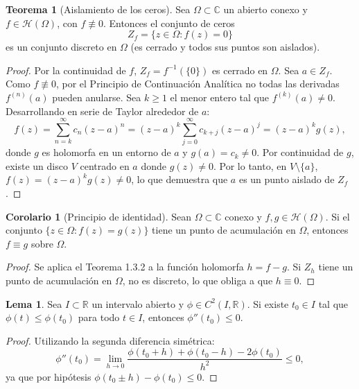 \documentclass[11pt,a4paper]{article}
\theoremstyle{definition}
\newtheorem{teorema}{Teorema}[section]
\newtheorem{lema}{Lema}[section]
\newtheorem{corolario}{Corolario}[section]
\theoremstyle{remark}
\numberwithin{equation}{section}
\begin{document}
\begin{teorema}[Aislamiento de los ceros]
Sea $\Omega \subset \mathbb{C}$ un abierto conexo y $f \in \mathcal{H}(\Omega)$, con $f \not\equiv 0$. Entonces el conjunto de ceros
\begin{equation}
Z_f = \{z \in \Omega : f(z) = 0\}
\end{equation}
es un conjunto discreto en $\Omega$ (es cerrado y todos sus puntos son aislados).
\end{teorema}
\begin{proof}
Por la continuidad de $f$, $Z_f = f^{-1}(\{0\})$ es cerrado en $\Omega$. Sea $a \in Z_f$. Como $f \not\equiv 0$, por el Principio de Continuación Analítica no todas las derivadas $f^{(n)}(a)$ pueden anularse. Sea $k \ge 1$ el menor entero tal que $f^{(k)}(a) \neq 0$. Desarrollando en serie de Taylor alrededor de $a$:
\[
f(z) = \sum_{n=k}^\infty c_n (z-a)^n = (z-a)^k \sum_{j=0}^\infty c_{k+j} (z-a)^j = (z-a)^k g(z),
\]
donde $g$ es holomorfa en un entorno de $a$ y $g(a) = c_k \neq 0$. Por continuidad de $g$, existe un disco $V$ centrado en $a$ donde $g(z) \neq 0$. Por lo tanto, en $V \setminus \{a\}$, $f(z) = (z-a)^k g(z) \neq 0$, lo que demuestra que $a$ es un punto aislado de $Z_f$.
\end{proof}

\begin{corolario}[Principio de identidad]
Sean $\Omega \subset \mathbb{C}$ conexo y $f, g \in \mathcal{H}(\Omega)$. Si el conjunto $\{z \in \Omega : f(z) = g(z)\}$ tiene un punto de acumulación en $\Omega$, entonces $f \equiv g$ sobre $\Omega$.
\end{corolario}
\begin{proof}
Se aplica el Teorema 1.3.2 a la función holomorfa $h = f - g$. Si $Z_h$ tiene un punto de acumulación en $\Omega$, no es discreto, lo que obliga a que $h \equiv 0$.
\end{proof}

\begin{lema}
Sea $I \subset \mathbb{R}$ un intervalo abierto y $\phi \in C^2(I, \mathbb{R})$. Si existe $t_0 \in I$ tal que $\phi(t) \le \phi(t_0)$ para todo $t \in I$, entonces $\phi''(t_0) \le 0$.
\end{lema}
\begin{proof}
Utilizando la segunda diferencia simétrica:
\[
\phi''(t_0) = \lim_{h \to 0} \frac{\phi(t_0+h) + \phi(t_0-h) - 2\phi(t_0)}{h^2} \le 0,
\]
ya que por hipótesis $\phi(t_0 \pm h) - \phi(t_0) \le 0$.
\end{proof}
\end{document}
